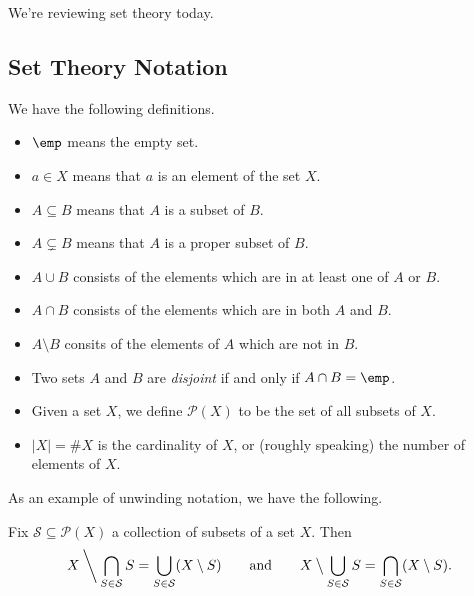 
We're reviewing set theory today.

\subsection{Set Theory Notation}
We have the following definitions.
\begin{itemize}
	\item $\emp$ means the empty set.
	\item $a\in X$ means that $a$ is an element of the set $X$.
	\item $A\subseteq B$ means that $A$ is a subset of $B$.
	\item $A\subsetneq B$ means that $A$ is a proper subset of $B$.
	\item $A\cup B$ consists of the elements which are in at least one of $A$ or $B$.
	\item $A\cap B$ consists of the elements which are in both $A$ and $B$.
	\item $A\setminus B$ consits of the elements of $A$ which are not in $B$.
	\item Two sets $A$ and $B$ are \textit{disjoint} if and only if $A\cap B=\emp$.
	\item Given a set $X$, we define $\mathcal P(X)$ to be the set of all subsets of $X$.
	\item $|X|=\#X$ is the cardinality of $X$, or (roughly speaking) the number of elements of $X$.
\end{itemize}
As an example of unwinding notation, we have the following.
\begin{proposition}
	Fix $\mathcal S\subseteq\mathcal P(X)$ a collection of subsets of a set $X$. Then
	\[X\mathbin{\bigg\backslash} \bigcap_{S\in\mathcal S}S=\bigcup_{S\in\mathcal S}(X\setminus S)\qquad\text{and}\qquad X\mathbin{\big\backslash}\bigcup_{S\in\mathcal S}S=\bigcap_{S\in\mathcal S}(X\setminus S).\]
\end{proposition}

